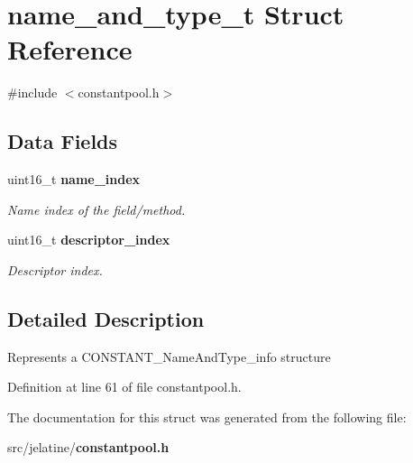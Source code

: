 \section{name\_\-and\_\-type\_\-t Struct Reference}
\label{structname__and__type__t}


{\ttfamily \#include $<$constantpool.h$>$}

\subsection*{Data Fields}
\begin{DoxyCompactItemize}
\item 
uint16\_\-t {\bf name\_\-index}\label{structname__and__type__t_ab1696cbc4f11fe23b8b4c833e72674e5}

\begin{DoxyCompactList}\small\item\em Name index of the field/method. \item\end{DoxyCompactList}\item 
uint16\_\-t {\bf descriptor\_\-index}\label{structname__and__type__t_a479c5bbc76a9e9ebf5f28c34e13f5513}

\begin{DoxyCompactList}\small\item\em Descriptor index. \item\end{DoxyCompactList}\end{DoxyCompactItemize}


\subsection{Detailed Description}
Represents a CONSTANT\_\-NameAndType\_\-info structure 

Definition at line 61 of file constantpool.h.



The documentation for this struct was generated from the following file:\begin{DoxyCompactItemize}
\item 
src/jelatine/{\bf constantpool.h}\end{DoxyCompactItemize}
